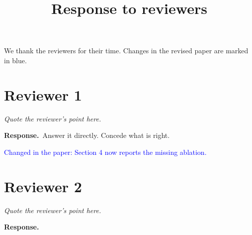 \documentclass[11pt]{article}
\title{Response to reviewers}
\author{}
\date{}
\newcommand{\reviewer}[1]{\section*{Reviewer #1}}
\newcommand{\point}[1]{\medskip\noindent\textit{#1}\par\nobreak}
\newcommand{\reply}{\par\nobreak\noindent\textbf{Response.}\ }
\newcommand{\changed}[1]{\par\nobreak\noindent\textcolor{blue}{Changed in the paper: #1}}
\begin{document}
\maketitle

\noindent We thank the reviewers for their time. Changes in the revised paper are marked in blue.

\reviewer{1}

\point{Quote the reviewer's point here.}
\reply Answer it directly. Concede what is right.
\changed{Section 4 now reports the missing ablation.}

\reviewer{2}

\point{Quote the reviewer's point here.}
\reply
\end{document}
